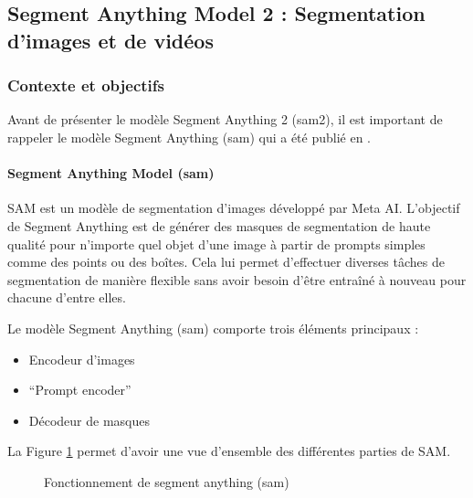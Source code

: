 
\subsection{Segment Anything Model 2 : Segmentation d'images et de vidéos}
\label{subsec:sam2_segment_anything_2024}

\subsubsection{Contexte et objectifs}
Avant de présenter le modèle Segment Anything 2 (\acrshort{sam2}), il est important de rappeler le modèle Segment Anything (\acrshort{sam}) qui a été publié en \citeyear{kirillov_segment_2023}.

\paragraph{Segment Anything Model (\acrshort{sam})}
\label{par:sam_segment_anything_2023}
SAM \cite{kirillov_segment_2023} est un modèle de segmentation d'images développé par Meta AI. L'objectif de Segment Anything est de générer des masques de segmentation de haute qualité pour n'importe quel objet d'une image à partir de prompts simples comme des points ou des boîtes. Cela lui permet d'effectuer diverses tâches de segmentation de manière flexible sans avoir besoin d'être entraîné à nouveau pour chacune d'entre elles.

Le modèle Segment Anything (\acrshort{sam}) comporte trois éléments principaux :
\begin{itemize}
    \item Encodeur d'images
    \item ``Prompt encoder''
    \item Décodeur de masques
\end{itemize}
La Figure \ref{fig:ch2_sam2_01_fonctionnement_sam} permet d’avoir une vue d’ensemble des différentes parties de SAM.

\begin{figure}[H]
    \centering
    \caption{Fonctionnement de segment anything (\acrshort{sam})}
    \label{fig:ch2_sam2_01_fonctionnement_sam}
\end{figure}

